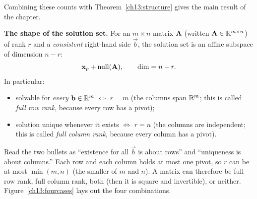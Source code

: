 Combining these counts with Theorem~\ref{ch13:structure} gives the main result of the
chapter.

\begin{formalbox}
\textbf{The shape of the solution set.} For an $m\times n$ matrix $\mathbf{A}$ (written
$\mathbf{A}\in\mathbb{R}^{m\times n}$) of rank $r$ and a
\emph{consistent} right-hand side $\vec{b}$, the solution set is an affine subspace of
dimension $n-r$:
\[
  \mathbf{x}_p+\operatorname{null}(\mathbf{A}),\qquad \dim=n-r.
\]
In particular:
\begin{itemize}
  \item solvable for \emph{every} $\mathbf{b}\in\mathbb{R}^m$ $\iff$ $r=m$ (the columns span $\mathbb{R}^m$;
    this is called \emph{full row rank}, because every row has a pivot);
  \item solution unique whenever it exists $\iff$ $r=n$ (the columns are independent;
    this is called \emph{full column rank}, because every column has a pivot).
\end{itemize}
\end{formalbox}

Read the two bullets as ``existence for all $\vec b$ is about rows'' and ``uniqueness is
about columns.'' Each row and each column holds at most one pivot, so $r$ can be at most $\min(m,n)$
(the smaller of $m$ and $n$). A matrix can therefore be full row
rank, full column rank, both (then it is square and invertible), or neither.
Figure~\ref{ch13:fourcases} lays out the four combinations.

